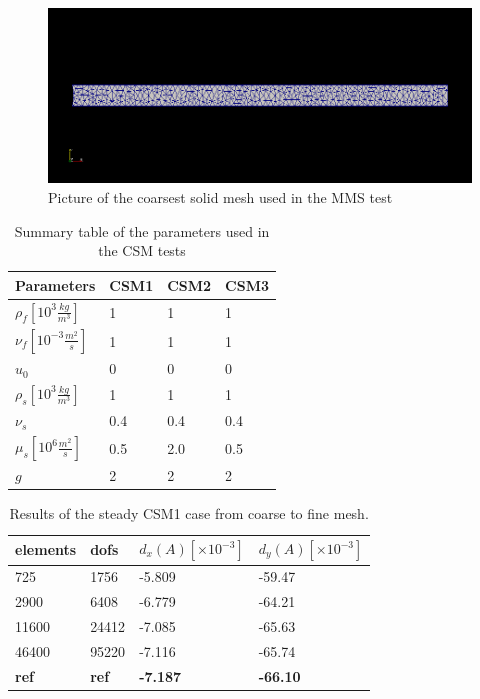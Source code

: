 \begin{center}
\begin{figure}[H]
\caption{Picture of the coarsest solid mesh used in the MMS test}
\includegraphics[scale=0.50,trim={18mm 55mm 18mm 55mm},clip]{./Verification_Validation/Hron_Turek/structure.png}
\end{figure}
\end{center}

\vspace{0cm}

\begin{table}[H]
\centering
\caption{Summary table of the parameters used in the CSM tests}
\label{my-label}
\begin{tabular}{|l|l|l|l|}
\hline
Parameters & CSM1 & CSM2 & CSM3 \\ \hline
$\rho_f[10^3 \frac{kg}{m^3}]$ & 1 & 1 & 1 \\ \hline
$\nu_f [10^{-3} \frac{m^2}{s}]$ & 1 & 1 & 1 \\ \hline
$u_0$ & 0 & 0 & 0 \\ \hline
$\rho_s[10^3 \frac{kg}{m^3}]$ & 1 & 1 & 1 \\ \hline
$\nu_s$ & 0.4 & 0.4 & 0.4 \\ \hline
$\mu_s[10^6 \frac{m^2}{s}]$ & 0.5 & 2.0 & 0.5 \\ \hline
$g $ & 2 & 2 & 2 \\ \hline
\end{tabular}
\end{table}

\begin{table}[H]
\centering
\caption{Results of the steady CSM1 case from coarse to fine mesh.}
\label{tab:CSM1}
\begin{tabular}{|l|l|l|l|}
\hline
elements & dofs & $d_x(A) [\times10^{-3}]$ & $d_y(A) [\times10^{-3}]$ \\ \hline
725 & 1756 & -5.809 & -59.47 \\ \hline
2900 & 6408 & -6.779 & -64.21 \\ \hline
11600 & 24412 & -7.085 & -65.63 \\ \hline
46400 & 95220 & -7.116 & -65.74 \\ \hline
\textbf{ref} & \textbf{ref} & \textbf{-7.187} &  \textbf{-66.10} \\ \hline
\end{tabular}
\end{table}


